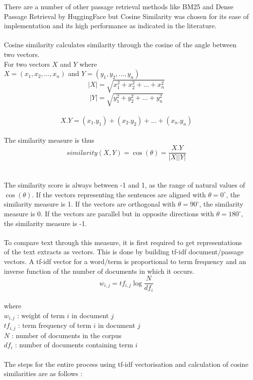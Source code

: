\documentclass[12pt, a4paper]{article}
\begin{document}
There are a number of other passage retrieval methods like BM25 and Dense Passage Retrieval by HuggingFace but Cosine Similarity was chosen for its ease of implementation and its high performance as indicated in the literature. 
\\~\\ 
Cosine similarity calculates similarity through the cosine of the angle between two vectors. \cite{cosine} \\ 
For two vectors \(X\) and \(Y\) where \\ 
\(X = (x_1, x_2, ..., x_n)\) and \(Y = (y_1, y_2, ..., y_n)\) 
\[|X| = \sqrt{x_1^2 + x_2^2 + ... + x_n^2}\]
\[|Y| = \sqrt{y_1^2 + y_2^2 + ... + y_n^2}\]
\\
\[X.Y = (x_1.y_1) + (x_2.y_2) + ... + (x_n.y_n)\]
\\ 
The similarity measure is thus 
\[similarity(X, Y) = \cos(\theta) = \frac{X.Y}{|X||Y|}\]
\\~\\
The similarity score is always between -1 and 1, as the range of natural values of \(\cos(\theta)\). If the vectors representing the sentences are aligned with \(\theta= 0^\circ\), the similarity measure is 1. If the vectors are orthogonal with \(\theta= 90^\circ\), the similarity measure is 0.  If the vectors are parallel but in opposite directions with \(\theta= 180^\circ\), the similarity measure is -1. 
\\~\\ 
To compare text through this measure, it is first required to get representations of the text extracts as vectors. This is done by building tf-idf document/passage vectors. A tf-idf vector for a word/term is proportional to term frequency and an inverse function of the number of documents in which it occurs. \cite{similarityMet} 
\[w_{i, j} = tf_{i, j} \log{\frac{N}{df_i}}\] 
\\
where \\  
\(w_{i,j}\) : weight of term \(i\) in document \(j\) \\ 
\(tf_{i, j}\) : term frequency of term \(i\) in document \(j\) \\  
\(N\) : number of documents in the corpus \\ 
\(df_i\) : number of documents containing term \(i\)  
\\~\\ 

The steps for the entire process using tf-idf vectorisation and calculation of cosine similarities are as follows : 
\end{document}
